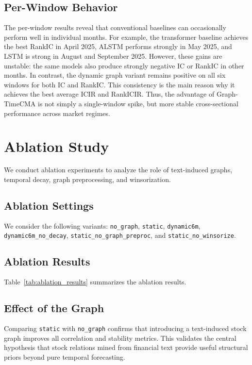 \documentclass[11pt]{article}
\begin{document}
\subsection{Per-Window Behavior}

The per-window results reveal that conventional baselines can occasionally perform well in individual months. For example, the transformer baseline achieves the best RankIC in April 2025, ALSTM performs strongly in May 2025, and LSTM is strong in August and September 2025. However, these gains are unstable: the same models also produce strongly negative IC or RankIC in other months. In contrast, the dynamic graph variant remains positive on all six windows for both IC and RankIC. This consistency is the main reason why it achieves the best average ICIR and RankICIR. Thus, the advantage of Graph-TimeCMA is not simply a single-window spike, but more stable cross-sectional performance across market regimes.

\section{Ablation Study}

We conduct ablation experiments to analyze the role of text-induced graphs, temporal decay, graph preprocessing, and winsorization.

\subsection{Ablation Settings}

We consider the following variants: \texttt{no\_graph}, \texttt{static}, \texttt{dynamic6m}, \texttt{dynamic6m\_no\_decay}, \texttt{static\_no\_graph\_preproc}, and \texttt{static\_no\_winsorize}.

\subsection{Ablation Results}

Table~\ref{tab:ablation_results} summarizes the ablation results.

\subsection{Effect of the Graph}

Comparing \texttt{static} with \texttt{no\_graph} confirms that introducing a text-induced stock graph improves all correlation and stability metrics. This validates the central hypothesis that stock relations mined from financial text provide useful structural priors beyond pure temporal forecasting.
\end{document}
